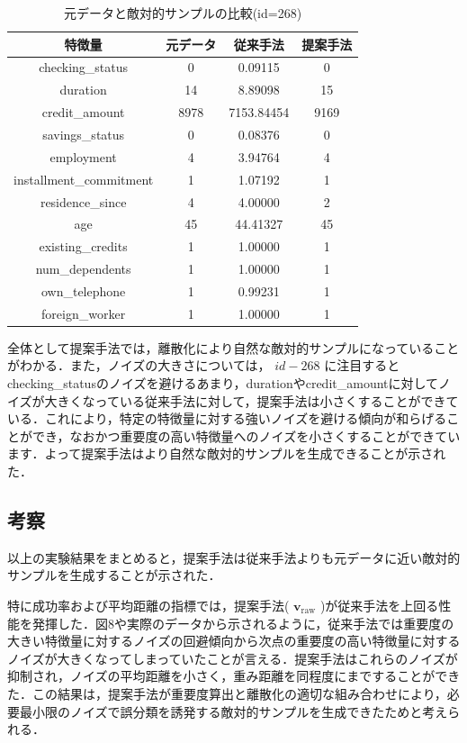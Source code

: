 \begin{table}[H]
    \centering
    \caption{元データと敵対的サンプルの比較(id=268)}
    \begin{tabular}{|c|c|c|c|} \hline
        特徴量 & 元データ & 従来手法 & 提案手法 \\ \hline
        checking\_status & 0 & 0.09115 & 0 \\ \hline
        duration & 14 & 8.89098 & 15 \\ \hline
        credit\_amount & 8978 & 7153.84454 & 9169 \\ \hline
        savings\_status & 0 & 0.08376 & 0 \\ \hline
        employment & 4 & 3.94764 & 4 \\ \hline
        installment\_commitment & 1 & 1.07192 & 1 \\ \hline
        residence\_since & 4 & 4.00000 & 2 \\ \hline
        age & 45 & 44.41327 & 45 \\ \hline
        existing\_credits & 1 & 1.00000 & 1 \\ \hline
        num\_dependents & 1 & 1.00000 & 1 \\ \hline
        own\_telephone & 1 & 0.99231 & 1 \\ \hline
        foreign\_worker & 1 & 1.00000 & 1 \\ \hline
    \end{tabular}
\end{table}

全体として提案手法では，離散化により自然な敵対的サンプルになっていることがわかる．また，ノイズの大きさについては， $id-268$ に注目するとchecking\_statusのノイズを避けるあまり，durationやcredit\_amountに対してノイズが大きくなっている従来手法に対して，提案手法は小さくすることができている．これにより，特定の特徴量に対する強いノイズを避ける傾向が和らげることができ，なおかつ重要度の高い特徴量へのノイズを小さくすることができています．よって提案手法はより自然な敵対的サンプルを生成できることが示された．

\subsection{考察}
以上の実験結果をまとめると，提案手法は従来手法よりも元データに近い敵対的サンプルを生成することが示された．

特に成功率および平均距離の指標では，提案手法( $\bm{v}_{\mathrm{raw}}$ )が従来手法を上回る性能を発揮した．図8や実際のデータから示されるように，従来手法では重要度の大きい特徴量に対するノイズの回避傾向から次点の重要度の高い特徴量に対するノイズが大きくなってしまっていたことが言える．提案手法はこれらのノイズが抑制され，ノイズの平均距離を小さく，重み距離を同程度にまですることができた．この結果は，提案手法が重要度算出と離散化の適切な組み合わせにより，必要最小限のノイズで誤分類を誘発する敵対的サンプルを生成できたためと考えられる．

